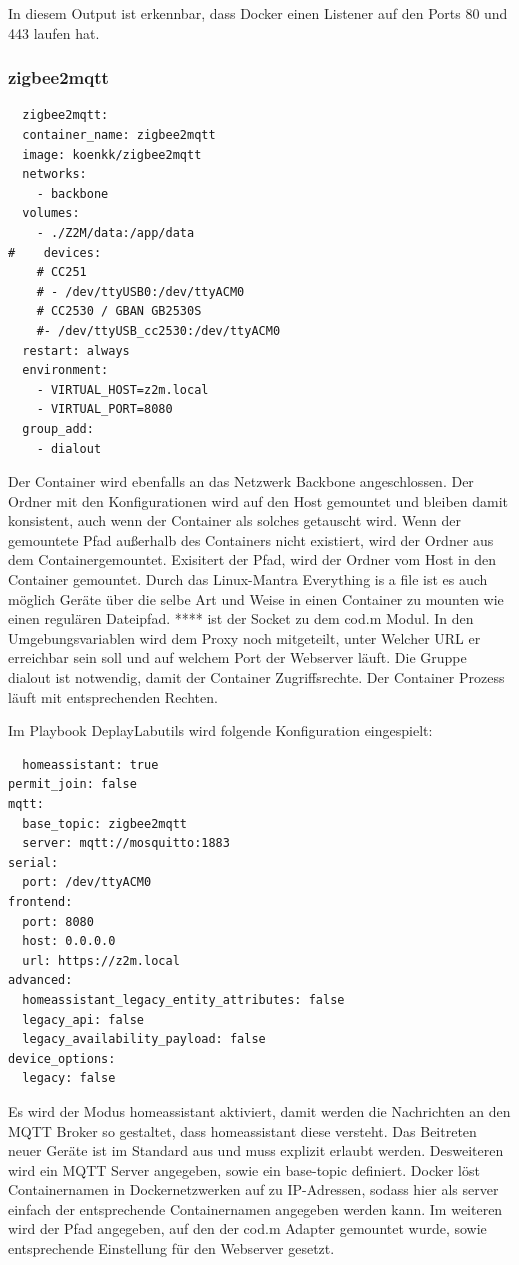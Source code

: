 In diesem Output ist erkennbar, dass Docker einen Listener auf den Ports 80 und 443 laufen hat.

\subsubsection{zigbee2mqtt}
\begin{lstlisting}
  zigbee2mqtt:
  container_name: zigbee2mqtt
  image: koenkk/zigbee2mqtt
  networks:
    - backbone
  volumes:
    - ./Z2M/data:/app/data
#    devices:
    # CC251
    # - /dev/ttyUSB0:/dev/ttyACM0
    # CC2530 / GBAN GB2530S
    #- /dev/ttyUSB_cc2530:/dev/ttyACM0
  restart: always
  environment:
    - VIRTUAL_HOST=z2m.local
    - VIRTUAL_PORT=8080
  group_add:
    - dialout
\end{lstlisting}

Der Container wird ebenfalls an das Netzwerk \grqq Backbone \grqq{} angeschlossen. Der Ordner mit den Konfigurationen wird auf den Host gemountet und 
bleiben damit konsistent, auch wenn der Container als solches getauscht wird. Wenn der gemountete Pfad außerhalb des Containers nicht existiert, wird der 
Ordner aus dem Containergemountet. Exisitert der Pfad, wird der Ordner vom Host in den Container gemountet. Durch das Linux-Mantra \grqq Everything is a file \grqq{}
ist es auch möglich Geräte über die selbe Art und Weise in einen Container zu mounten wie einen regulären Dateipfad. **** ist der Socket zu dem cod.m Modul.
In den Umgebungsvariablen wird dem Proxy noch mitgeteilt, unter Welcher URL er erreichbar sein soll und auf welchem Port der Webserver läuft. Die Gruppe 
\grqq dialout \grqq{} ist notwendig, damit der Container Zugriffsrechte. Der Container Prozess läuft mit entsprechenden Rechten.

Im Playbook \grqq DeplayLabutils \grqq{} wird folgende Konfiguration eingespielt:
\begin{lstlisting}
  homeassistant: true
permit_join: false
mqtt:
  base_topic: zigbee2mqtt
  server: mqtt://mosquitto:1883
serial:
  port: /dev/ttyACM0
frontend:
  port: 8080
  host: 0.0.0.0
  url: https://z2m.local
advanced:
  homeassistant_legacy_entity_attributes: false
  legacy_api: false
  legacy_availability_payload: false
device_options:
  legacy: false
\end{lstlisting}

Es wird der Modus \grqq homeassistant \grqq{} aktiviert, damit werden die Nachrichten an den MQTT Broker so gestaltet, dass homeassistant diese versteht.
Das Beitreten neuer Geräte ist im Standard aus und muss explizit erlaubt werden. Desweiteren wird ein MQTT Server angegeben, sowie ein \grqq base-topic \grqq{}
definiert. Docker löst Containernamen in Dockernetzwerken auf zu IP-Adressen, sodass hier als server einfach der entsprechende Containernamen angegeben werden
kann. Im weiteren wird der Pfad angegeben, auf den der cod.m Adapter gemountet wurde, sowie entsprechende Einstellung für den Webserver gesetzt.


